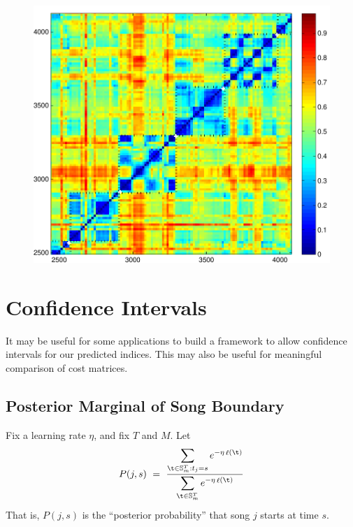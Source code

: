 \documentclass[twocolumn]{article}
\DeclareMathOperator{\loss}{\ell}
\newcommand{\segs}{\mathbb S}
\begin{document}
	\begin{figure}[t]
		\centering
		\includegraphics[width=\textwidth]{images/simmat_preds}
		
		\caption{ }
		\label{fig:predictions}
	\end{figure} 
	
\section{Confidence Intervals}\label{sec:confidence-intervals}
	
It may be useful for some applications to build a framework to allow confidence intervals for our predicted indices. This may also be useful for meaningful comparison of cost matrices.
	
	\subsection{Posterior Marginal of Song Boundary}
	Fix a learning rate $\eta$, and fix $T$ and $M$. Let
	\[
	P(j,s) ~=~ 
	\frac{\displaystyle
		\sum_{\t \in \segs^T_m : t_j = s} e^{- \eta \loss(\t)}
	}{\displaystyle
	\sum_{\t \in \segs^T_m} e^{- \eta \loss(\t)}
}
\]
That is, $P(j,s)$ is the ``posterior probability'' that song $j$ starts at time $s$.
\end{document}

